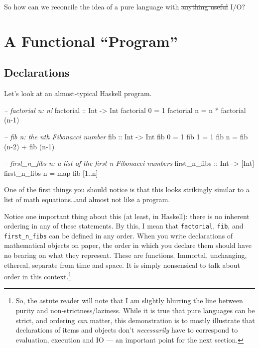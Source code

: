 \documentclass[]{article}
\newenvironment{Shaded}{}{}
\newcommand{\CommentTok}[1]{\textcolor[rgb]{0.38,0.63,0.69}{\textit{#1}}}
\newcommand{\DataTypeTok}[1]{\textcolor[rgb]{0.56,0.13,0.00}{#1}}
\newcommand{\DecValTok}[1]{\textcolor[rgb]{0.25,0.63,0.44}{#1}}
\newcommand{\FunctionTok}[1]{\textcolor[rgb]{0.02,0.16,0.49}{#1}}
\newcommand{\NormalTok}[1]{#1}
\newcommand{\OtherTok}[1]{\textcolor[rgb]{0.00,0.44,0.13}{#1}}
\begin{document}
So how can we reconcile the idea of a pure language with \sout{anything useful}
I/O?

\hypertarget{a-functional-program}{%
\section{A Functional ``Program''}\label{a-functional-program}}

\hypertarget{declarations}{%
\subsection{Declarations}\label{declarations}}

Let's look at an almost-typical Haskell program.

\begin{Shaded}
\begin{Highlighting}[]
\CommentTok{--  factorial n: n!}
\OtherTok{factorial ::} \DataTypeTok{Int} \OtherTok{->} \DataTypeTok{Int}
\NormalTok{factorial }\DecValTok{0} \FunctionTok{=} \DecValTok{1}
\NormalTok{factorial n }\FunctionTok{=}\NormalTok{ n }\FunctionTok{*}\NormalTok{ factorial (n}\FunctionTok{-}\DecValTok{1}\NormalTok{)}

\CommentTok{--  fib n: the nth Fibonacci number}
\OtherTok{fib ::} \DataTypeTok{Int} \OtherTok{->} \DataTypeTok{Int}
\NormalTok{fib }\DecValTok{0} \FunctionTok{=} \DecValTok{1}
\NormalTok{fib }\DecValTok{1} \FunctionTok{=} \DecValTok{1}
\NormalTok{fib n }\FunctionTok{=}\NormalTok{ fib (n}\FunctionTok{-}\DecValTok{2}\NormalTok{) }\FunctionTok{+}\NormalTok{ fib (n}\FunctionTok{-}\DecValTok{1}\NormalTok{)}

\CommentTok{--  first_n_fibs n: a list of the first n Fibonacci numbers}
\OtherTok{first_n_fibs ::} \DataTypeTok{Int} \OtherTok{->}\NormalTok{ [}\DataTypeTok{Int}\NormalTok{]}
\NormalTok{first_n_fibs n }\FunctionTok{=}\NormalTok{ map fib [}\DecValTok{1}\FunctionTok{..}\NormalTok{n]}
\end{Highlighting}
\end{Shaded}

One of the first things you should notice is that this looks strikingly similar
to a list of math equations\ldots{}and almost not like a program.

Notice one important thing about this (at least, in Haskell): there is no
inherent ordering in any of these statements. By this, I mean that
\texttt{factorial}, \texttt{fib}, and \texttt{first\_n\_fibs} can be defined in
any order. When you write declarations of mathematical objects on paper, the
order in which you declare them should have no bearing on what they represent.
These are functions. Immortal, unchanging, ethereal, separate from time and
space. It is simply nonsensical to talk about order in this context.\footnote{So,
  the astute reader will note that I am slightly blurring the line between
  purity and non-strictness/laziness. While it is true that pure languages can
  be strict, and ordering \emph{can} matter, this demonstration is to mostly
  illustrate that declarations of items and objects don't \emph{necessarily}
  have to correspond to evaluation, execution and IO --- an important point for
  the next section.}
\end{document}
